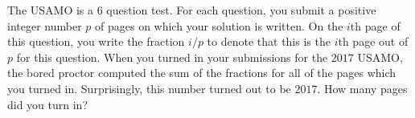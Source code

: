 The USAMO is a $6$ question test. For each question, you submit a positive integer number $p$ of pages on which your solution is written. On the $i$th page of this question, you write the fraction $i/p$ to denote that this is the $i$th page out of $p$ for this question. When you turned in your submissions for the $2017$ USAMO, the bored proctor computed the sum of the fractions for all of the pages which you turned in. Surprisingly, this number turned out to be $2017$. How many pages did you turn in?
